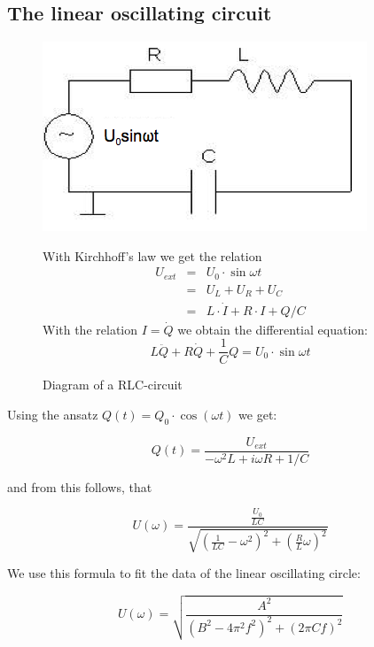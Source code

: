 \subsection{The linear oscillating circuit}
\begin{figure}[H]
\begin{minipage}{0.5\textwidth}
\includegraphics[width=\textwidth]{Bilder/lincirc.png}
\caption{Diagram of a RLC-circuit}
\end{minipage}
\begin{minipage}{0.5\textwidth}
With Kirchhoff's law we get the relation \begin{eqnarray*}  
U_{ext} &=& U_0\cdot\sin\omega t \\
&=& U_L + U_R + U_C\\
&=& L\cdot \dot I + R\cdot I + Q/C
\end{eqnarray*}
With the relation $I = \dot Q$ we obtain the differential equation:
$$ L\ddot Q + R \dot Q + \frac{1}{C}Q = U_0\cdot\sin \omega t $$
\end{minipage}
\end{figure}

Using the ansatz $Q(t) = Q_0 \cdot\cos(\omega t)$ we get:

$$Q(t) = \frac{U_{ext}}{-\omega^2L+i\omega R + 1/C}$$

and from this follows, that

$$U(\omega) = \frac{ \frac{U_0}{LC} }{ \sqrt{ (\frac{1}{LC} - \omega^2 )^2+ (\frac{R}{L}\omega)^2}}$$

We use this formula to fit the data of the linear oscillating circle:

\begin{equation} U(\omega) = \sqrt{\frac{A^2}{(B^2-4\pi^2f^2)^2 + (2\pi Cf)^2}} \end{equation}

